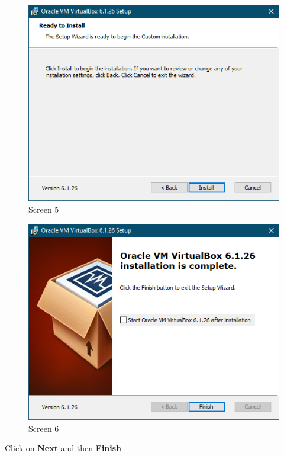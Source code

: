 \documentclass[a4paper, 12pt, titlepage]{report}
\begin{document}
\begin{multicols}{2}
\begin{figure}[H]
    \centering
    \includegraphics[scale=0.5]{pics/vb5.PNG}
    \caption{Screen 5}
\end{figure}
\begin{figure}[H]
    \centering
    \includegraphics[scale=0.5]{pics/vb6.PNG}
    \caption{Screen 6}
\end{figure}
\end{multicols}
Click on \textbf{Next} and then \textbf{Finish}
\end{document}
